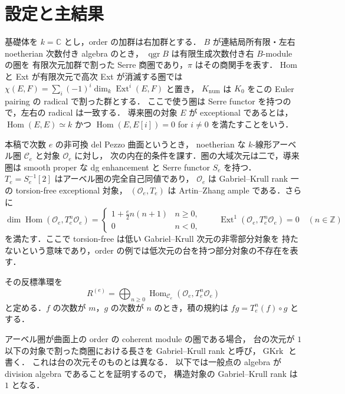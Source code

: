 \section{設定と主結果}
\label{sec:main}

基礎体を $k=\mathbb C$ とし，order の加群は右加群とする．
$B$ が連結局所有限・左右 noetherian 次数付き algebra のとき，
$\operatorname{qgr}B$ は有限生成次数付き右 $B$-module の圏を
有限次元加群で割った Serre 商圏であり，$\pi$ はその商関手を表す．
Hom と Ext が有限次元で高次 Ext が消滅する圏では
$\chi(E,F)=\sum_i(-1)^i\dim_k\operatorname{Ext}^i(E,F)$ と置き，
$K_{\mathrm{num}}$ は $K_0$ をこの Euler pairing の radical で割った群とする．
ここで使う圏は Serre functor を持つので，左右の radical は一致する．
導来圏の対象 $E$ が exceptional であるとは，
$\operatorname{Hom}(E,E)\simeq k$ かつ
$\operatorname{Hom}(E,E[i])=0$ for $i\ne0$ を満たすことをいう．

\begin{definition}
本稿で次数 $e$ の非可換 del Pezzo 曲面というとき，
noetherian な $k$-線形アーベル圏 $\mathcal C_e$ と対象 $\mathcal O_e$ に対し，
次の内在的条件を課す．圏の大域次元は二で，導来圏は smooth proper な
dg enhancement と Serre functor $S_e$ を持つ．
$T_e=S_e^{-1}[2]$ はアーベル圏の完全自己同値であり，
$\mathcal O_e$ は Gabriel--Krull rank 一の torsion-free exceptional 対象，
$(\mathcal O_e,T_e)$ は Artin--Zhang ample である．さらに
\[
 \dim\operatorname{Hom}(\mathcal O_e,T_e^n\mathcal O_e)
 =\begin{cases}1+\frac e2 n(n+1)&n\ge0,\\0&n<0,\end{cases}
 \qquad
 \operatorname{Ext}^1(\mathcal O_e,T_e^n\mathcal O_e)=0
 \quad(n\in\mathbb Z)
\]
を満たす．ここで torsion-free は低い Gabriel--Krull 次元の非零部分対象を
持たないという意味であり，order の例では低次元の台を持つ部分対象の不存在を表す．
\end{definition}

その反標準環を
\[
 R^{(e)}=\bigoplus_{n\ge0}
 \operatorname{Hom}_{\mathcal C_e}(\mathcal O_e,T_e^n\mathcal O_e)
\]
と定める．$f$ の次数が $m$，$g$ の次数が $n$ のとき，積の規約は
$fg=T_e^n(f)\circ g$ とする．

アーベル圏が曲面上の order の coherent module の圏である場合，
台の次元が $1$ 以下の対象で割った商圏における長さを
Gabriel--Krull rank と呼び，$\operatorname{GKrk}$ と書く．
これは台の次元そのものとは異なる．
以下では一般点の algebra が division algebra であることを証明するので，
構造対象の Gabriel--Krull rank は $1$ となる．

